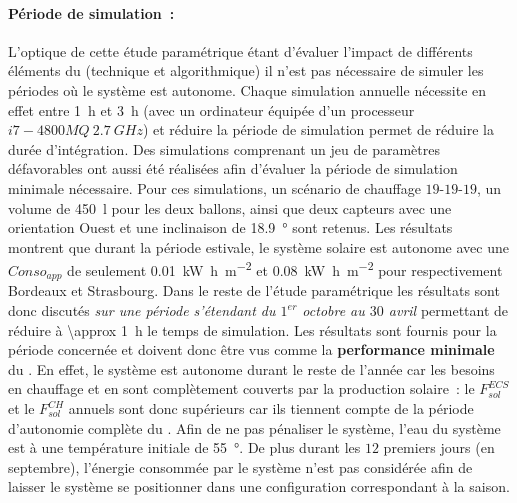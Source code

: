 \paragraph{Période de simulation~:} %
\label{par:periode_de_simulation}
L’optique de cette étude paramétrique étant d’évaluer l’impact de différents éléments du
 (technique et algorithmique) il n’est pas nécessaire de simuler les périodes où
le système est autonome. Chaque simulation annuelle nécessite en effet entre
\SI{1}{\hour} et \SI{3}{\hour} (avec un ordinateur équipée d’un processeur $i7-4800MQ\  \SI{2.7}{GHz}$)
et réduire la période de simulation permet de réduire la durée
d’intégration. Des simulations comprenant un jeu de paramètres défavorables ont aussi été
réalisées afin d’évaluer la période de simulation minimale nécessaire. Pour ces
simulations, un scénario de chauffage $19$-$19$-$19$, un volume de \SI{450}{\litre} pour les
deux ballons, ainsi que deux capteurs avec une orientation Ouest et une inclinaison de
\SI{18.9}{\degree} sont retenus. Les résultats montrent que durant la
période estivale, le système solaire est autonome avec une $Conso_{app}$ de seulement
\SI[per-mode=symbol]{0.01}{\kilo\watt\hour\per\metre\squared} et
\SI[per-mode=symbol]{0.08}{\kilo\watt\hour\per\metre\squared}
pour respectivement Bordeaux et Strasbourg. Dans le reste de l’étude paramétrique
les résultats sont donc discutés \emph{sur une période s’étendant du $1^{er}$
octobre au $30$ avril} permettant de réduire à \SI{\approx 1}{\hour} le temps de simulation. Les
résultats sont fournis pour la période concernée et doivent donc être vus comme la
\textbf{performance minimale} du . En effet, le système est autonome durant le reste
de l’année car les besoins en chauffage et en  sont complètement couverts par la
production solaire~: le $F_{sol}^{ECS}$ et le $F_{sol}^{CH}$ annuels sont donc
supérieurs car ils tiennent compte de la période d’autonomie complète du .
Afin de ne pas pénaliser le système, l’eau du système est à une température
initiale de \SI{55}{\degree}. De plus durant les $12$ premiers jours (en septembre),
l’énergie consommée par le système n’est pas considérée afin de laisser le système
se positionner dans une configuration correspondant à la saison.




